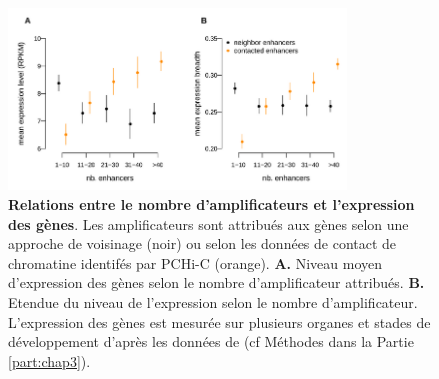 \begin{figure}[h]
    \centering
    \includegraphics[width=0.8\textwidth, page=1] {figures/chap2/chap2-fig7.png}
    \caption[Relations entre le nombre d'amplificateurs et l'expression des gènes.]{
    \textbf{Relations entre le nombre d'amplificateurs et l'expression des gènes}. Les amplificateurs sont attribués aux gènes selon une approche de voisinage (noir) ou selon les données de contact de chromatine identifés par \gls{PCHi-C} (orange).
    \textbf{A.} Niveau moyen d'expression des gènes selon le nombre d'amplificateur attribués.
    \textbf{B.} Etendue du niveau de l'expression selon le nombre d'amplificateur.
    L'expression des gènes est mesurée sur plusieurs organes et stades de développement d'après les données de \citep{cardoso-moreira_gene_2019} (cf Méthodes dans la Partie \ref{part:chap3}).
    }
    \label{fig:chap2-fig7}
\end{figure} 

